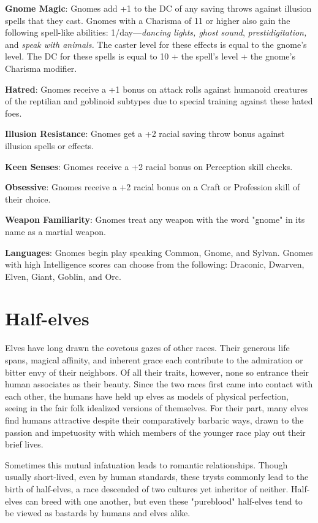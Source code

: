 \textbf{Gnome Magic}: Gnomes add +1 to the DC of any saving throws against illusion spells that they cast. Gnomes with a Charisma of 11 or higher also gain the following spell-like abilities: 1/day---\textit{dancing lights, ghost sound},\textit{ prestidigitation,} and \textit{speak with animals. }The caster level for these effects is equal to the gnome's level. The DC for these spells is equal to 10 + the spell's level + the gnome's Charisma modifier.
				
\textbf{Hatred}: Gnomes receive a +1 bonus on attack rolls against humanoid creatures of the reptilian and goblinoid subtypes due to special training against these hated foes.
				
\textbf{Illusion Resistance}: Gnomes get a +2 racial saving throw bonus against illusion spells or effects.
				
\textbf{Keen Senses}: Gnomes receive a +2 racial bonus on Perception skill checks.
				
\textbf{Obsessive}: Gnomes receive a +2 racial bonus on a Craft or Profession skill of their choice.
				
\textbf{Weapon Familiarity}: Gnomes treat any weapon with the word "gnome" in its name as a martial weapon.
				
\textbf{Languages}: Gnomes begin play speaking Common, Gnome, and Sylvan. Gnomes with high Intelligence scores can choose from the following: Draconic, Dwarven, Elven, Giant, Goblin, and Orc.
							
\section{Half-elves}

				
Elves have long drawn the covetous gazes of other races. Their generous life spans, magical affinity, and inherent grace each contribute to the admiration or bitter envy of their neighbors. Of all their traits, however, none so entrance their human associates as their beauty. Since the two races first came into contact with each other, the humans have held up elves as models of physical perfection, seeing in the fair folk idealized versions of themselves. For their part, many elves find humans attractive despite their comparatively barbaric ways, drawn to the passion and impetuosity with which members of the younger race play out their brief lives.
				
Sometimes this mutual infatuation leads to romantic relationships. Though usually short-lived, even by human standards, these trysts commonly lead to the birth of half-elves, a race descended of two cultures yet inheritor of neither. Half-elves can breed with one another, but even these "pureblood" half-elves tend to be viewed as bastards by humans and elves alike.
				
